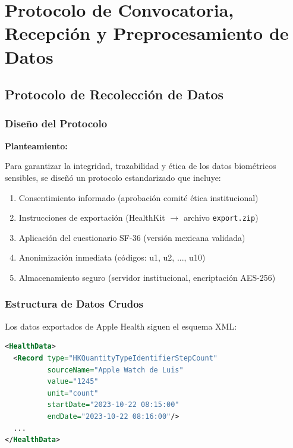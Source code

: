 \documentclass[12pt,letterpaper,twoside]{report}
\begin{document}
\chapter{Protocolo de Convocatoria, Recepción y Preprocesamiento de Datos}

\section{Protocolo de Recolección de Datos}

\subsection{Diseño del Protocolo}

\begin{hipotesisbox}
\textbf{Planteamiento:}

Para garantizar la integridad, trazabilidad y ética de los datos biométricos sensibles, se diseñó un protocolo estandarizado que incluye:
\begin{enumerate}[noitemsep]
    \item Consentimiento informado (aprobación comité ética institucional)
    \item Instrucciones de exportación (HealthKit $\to$ archivo \texttt{export.zip})
    \item Aplicación del cuestionario SF-36 (versión mexicana validada)
    \item Anonimización inmediata (códigos: u1, u2, ..., u10)
    \item Almacenamiento seguro (servidor institucional, encriptación AES-256)
\end{enumerate}
\end{hipotesisbox}

\subsection{Estructura de Datos Crudos}

Los datos exportados de Apple Health siguen el esquema XML:

\begin{lstlisting}[language=XML, caption={Estructura XML de Apple Health Export}]
<HealthData>
  <Record type="HKQuantityTypeIdentifierStepCount"
          sourceName="Apple Watch de Luis"
          value="1245"
          unit="count"
          startDate="2023-10-22 08:15:00"
          endDate="2023-10-22 08:16:00"/>
  ...
</HealthData>
\end{lstlisting}
\end{document}
